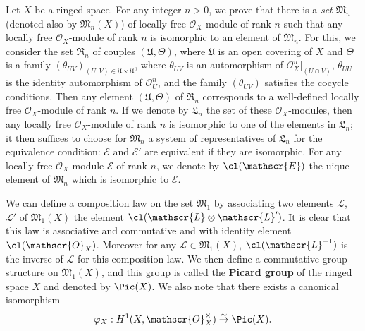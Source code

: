 \begin{remark}
Let $X$ be a ringed space. For any integer $n>0$, we prove that there is a \textit{set} $\mathfrak{M}_n$ (denoted also by $\mathfrak{M}_n(X)$) of locally free $\mathscr{O}_X$-module of rank $n$ such that any locally free $\mathscr{O}_X$-module of rank $n$ is isomorphic to an element of $\mathfrak{M}_n$. For this, we consider the set $\mathfrak{R}_n$ of couples $(\mathfrak{U},\Theta)$, where $\mathfrak{U}$ is an open covering of $X$ and $\Theta$ is a family $(\theta_{UV})_{(U,V)\in\mathfrak{U}\times\mathfrak{U}}$, where $\theta_{UV}$ is an automorphism of $\mathscr{O}_X^n|_{(U\cap V)}$, $\theta_{UU}$ is the identity automorphism of $\mathscr{O}_U^n$, and the family $(\theta_{UV})$ satisfies the cocycle conditions. Then any element $(\mathfrak{U},\Theta)$ of $\mathfrak{R}_n$ corresponds to a well-defined locally free $\mathscr{O}_X$-module of rank $n$. If we denote by $\mathfrak{L}_n$ the set of these $\mathscr{O}_X$-modules, then any locally free $\mathscr{O}_X$-module of rank $n$ is isomorphic to one of the elements in $\mathfrak{L}_n$; it then suffices to choose for $\mathfrak{M}_n$ a system of representatives of $\mathfrak{L}_n$ for the equivalence condition: $\mathscr{E}$ and $\mathscr{E}'$ are equivalent if they are isomorphic. For any locally free $\mathscr{O}_X$-module $\mathscr{E}$ of rank $n$, we denote by $\cl(\mathscr{E})$ the uique element of $\mathfrak{M}_n$ which is isomorphic to $\mathscr{E}$.\par
We can define a composition law on the set $\mathfrak{M}_1$ by associating two elements $\mathscr{L}$, $\mathscr{L}'$ of $\mathfrak{M}_1(X)$ the element $\cl(\mathscr{L}\otimes\mathscr{L}')$. It is clear that this law is associative and commutative and with identity element $\cl(\mathscr{O}_X)$. Moreover for any $\mathscr{L}\in\mathfrak{M}_1(X)$, $\cl(\mathscr{L}^{-1})$ is the inverse of $\mathscr{L}$ for this composition law. We then define a commutative group structure on $\mathfrak{M}_1(X)$, and this group is called the \textbf{Picard group} of the ringed space $X$ and denoted by $\Pic(X)$. We also note that there exists a canonical isomorphism
\[\varphi_X:H^1(X,\mathscr{O}_X^{\times})\stackrel{\sim}{\to}\Pic(X).\]

\end{remark}
